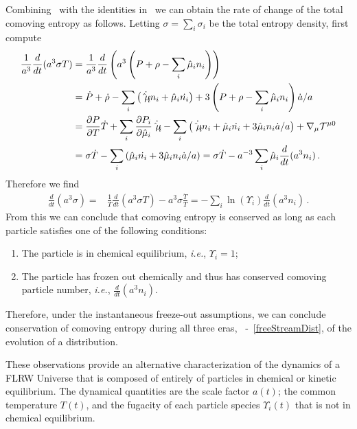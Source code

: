 Combining~ with the identities in~ we can obtain the rate of change of the total comoving entropy as follows. Letting $\sigma=\sum_i \sigma_i$ be the total entropy density, first compute
\begin{align}\frac{1}{a^3}\frac{d}{dt}(a^3\sigma T)&=\frac{1}{a^{3}}\frac{d}{dt}\left(a^3\left(P+\rho-\sum_i \hat{\mu}_i n_i\right)\right)\\
&=\dot{P}+\dot{\rho}-\sum_i \left(\dot{\hat{\mu}_i}n_i+\hat{\mu}_i\dot{n_i}\right)+3\left(P+\rho-\sum_i \hat{\mu}_i n_i\right)\dot{a}/a\notag\\
&=\frac{\partial P}{\partial T} \dot{T}+\sum_i\frac{\partial P_i}{\partial \hat{\mu}_i} \dot{\hat{\mu}_i}-\sum_i \left(\dot{\hat{\mu}_i}n_i+\hat{\mu}_i\dot{n_i}+3\hat{\mu}_i n_i \dot{a}/a\right)+\nabla_\mu \mathcal{T}^{\mu 0}\notag\\
&=\sigma\dot{T}-\sum_i \left(\hat{\mu}_i\dot{n_i}+3\hat{\mu}_i n_i \dot{a}/a\right)%
=\sigma\dot{T}- a^{-3}\sum_i\hat{\mu}_i\frac{d}{dt}(a^3n_i)\,.\notag
\end{align}
Therefore we find
\begin{align}\label{S:n:eq}
\frac{d}{dt}(a^3\sigma )=&\frac{1}{T}\frac{d}{dt}(a^3\sigma T)-a^3\sigma \frac{\dot T}{T}=-\sum_i\ln(\Upsilon_i)\frac{d}{dt}(a^3n_i)\,.
\end{align}
From this we can conclude that comoving entropy is conserved as long as each particle satisfies one of the following conditions:
\begin{enumerate}
\item
The particle is in chemical equilibrium, {\it i.e.\/}, $\Upsilon_i= 1$;
\item
The particle has frozen out chemically and thus has conserved comoving particle number, {\it i.e.\/}, $\frac{d}{dt}(a^3n_i)$. 
\end{enumerate}
Therefore, under the instantaneous freeze-out assumptions, we can conclude conservation of comoving entropy during all three eras, ~-~\eqref{freeStreamDist}, of the evolution of a distribution. 

These observations provide an alternative characterization of the dynamics of a FLRW Universe that is composed of entirely of particles in chemical or kinetic equilibrium. The dynamical quantities are the scale factor $a(t)$; the common temperature $T(t)$, and the fugacity of each particle species $\Upsilon_i(t)$ that is not in chemical equilibrium. 

